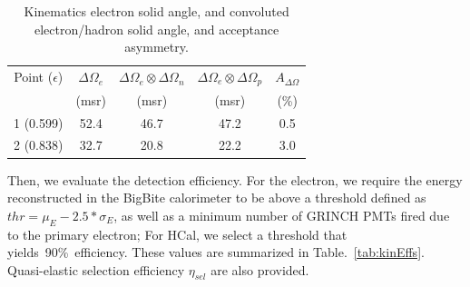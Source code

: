 \begin{table}[h]
\centering
\begin{tabular}{|c|c|c|c|c|}
\hline
Point ($\epsilon$) & $\Delta\Omega_e$ & $\Delta\Omega_e \otimes \Delta\Omega_n$ & $\Delta\Omega_e \otimes \Delta\Omega_p$ & $A_{\Delta\Omega}$ \\
 & (msr) & (msr) & (msr) & (\%) \\
\hline
1 (0.599) & 52.4 & 46.7 & 47.2 & 0.5 \\
\hline
2 (0.838) & 32.7 & 20.8 & 22.2 & 3.0 \\
\hline
\end{tabular} 
\caption{Kinematics electron solid angle, and convoluted electron/hadron solid angle, and acceptance asymmetry.}
\label{tab:kinExpParams}
\end{table}

Then, we evaluate the detection efficiency. For the electron, we require the energy reconstructed in the BigBite calorimeter to be above a threshold defined as $thr = \mu_E- 2.5* \sigma_E$, as well as a minimum number of GRINCH PMTs fired due to the primary electron; For HCal, we select a threshold that yields~90\%~efficiency. These values are summarized in Table.~\ref{tab:kinEffs}.
Quasi-elastic selection efficiency $\eta_{sel}$ are also provided.

